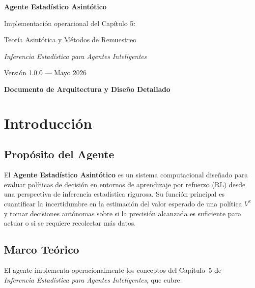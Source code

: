\documentclass[12pt,a4paper]{article}
\begin{document}
\begin{titlepage}
	\centering
	\vspace*{3cm}
	{\Huge\bfseries Agente Estadístico Asintótico\par}
	\vspace{0.5cm}
	{\Large Implementación operacional del Capítulo 5:\par}
	{\Large Teoría Asintótica y Métodos de Remuestreo\par}
	\vspace{1.5cm}
	{\large\textit{Inferencia Estadística para Agentes Inteligentes}\par}
	\vspace{1cm}
	{\large Versión 1.0.0 --- Mayo 2026\par}
	\vspace{2cm}
	{\large\bfseries Documento de Arquitectura y Diseño Detallado\par}
	\vfill
\end{titlepage}

\tableofcontents
\newpage

\section{Introducción}

\subsection{Propósito del Agente}

El \textbf{Agente Estadístico Asintótico} es un sistema computacional diseñado para evaluar políticas de decisión en entornos de aprendizaje por refuerzo (RL) desde una perspectiva de inferencia estadística rigurosa. Su función principal es cuantificar la incertidumbre en la estimación del valor esperado de una política $V^{\pi}$ y tomar decisiones autónomas sobre si la precisión alcanzada es suficiente para actuar o si se requiere recolectar más datos.

\subsection{Marco Teórico}

El agente implementa operacionalmente los conceptos del Capítulo~5 de \textit{Inferencia Estadística para Agentes Inteligentes}, que cubre:
\end{document}
